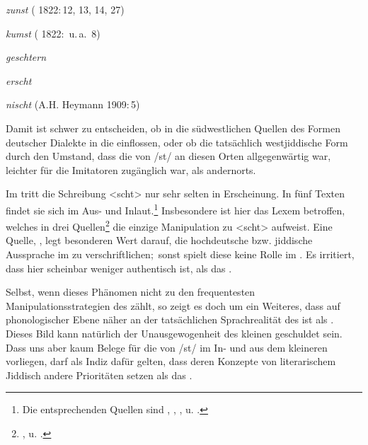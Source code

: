 {{ \item {} \textit{zunst}  ( 1822:\,12, 13, 14, 27)
\label{bspgrob24} 

 \item  {} \textit{kumst}  ( 1822:\, u.\,a.\, 8)
\label{bspgrob25} 

\item \textit{geschtern}  \parencite[125]{Reershemius2007}
\label {bspaurich1}
 
\item \textit{erscht} 
 \parencite[125]{Reershemius2007}
\label {bspaurich2}

\item \textit{nischt}  (A.H. Heymann  1909:\,5)
 
 }\label{bspwjscht}

Damit ist schwer zu entscheiden, ob in die südwestlichen Quellen des   Formen deutscher Dialekte in die  einflossen, oder ob die tatsächlich westjiddische Form durch den Umstand, dass die  von /st/ an diesen Orten allgegenwärtig war, leichter für die Imitatoren zugänglich war, als andernorts.

Im  tritt die Schreibung <scht> nur sehr selten in Erscheinung. In fünf Texten findet sie sich im Aus- und Inlaut.\footnote{Die entsprechenden Quellen sind , , ,  u. .} Insbesondere ist hier das Lexem  betroffen, welches in drei Quellen\footnote{,  u. .} die einzige Manipulation zu <scht> aufweist. Eine Quelle, , legt besonderen Wert darauf, die hochdeutsche bzw. jiddische Aussprache im  zu verschriftlichen;\, sonst spielt diese keine Rolle im . Es irritiert, dass  hier scheinbar weniger authentisch ist, als das .


Selbst, wenn dieses Phänomen nicht zu den frequentesten Manipulationsstrategien des \hai{{\LiJi}} zählt, so zeigt es doch um ein Weiteres, dass  auf phonologischer Ebene näher an der tatsächlichen Sprachrealität des \hai{{\WJ}} ist als . Dieses Bild kann natürlich der Unausgewogenheit des kleinen  geschuldet sein. Dass uns aber kaum Belege für die  von /st/ im In- und  aus dem kleineren  vorliegen, darf als Indiz dafür gelten, dass deren Konzepte von literarischem Jiddisch andere Prioritäten setzen als das . 

}
